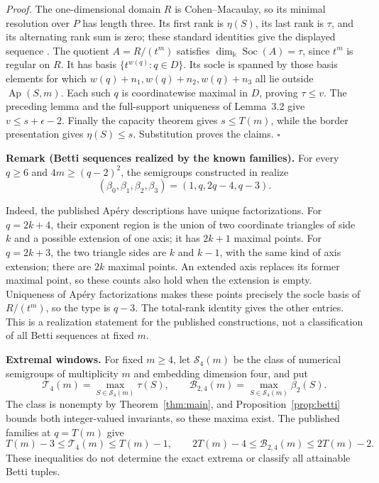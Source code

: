 \documentclass[11pt]{article}
\begin{document}
\emph{Proof.}
The one-dimensional domain $R$ is Cohen--Macaulay, so its minimal
resolution over $P$ has length three.  Its first rank is $\eta(S)$,
its last rank is $\tau$, and its alternating rank sum is zero; these
standard identities give the displayed sequence
\cite[Section~1]{MSSurvey25}.
The quotient $A=R/(t^m)$ satisfies $\dim_{\Bbbk}\operatorname{Soc}(A)=\tau$, since $t^m$ is regular on $R$. It has basis
$\{t^{w(q)}:q\in D\}$.
Its socle is spanned by those basis elements for which
$w(q)+n_1,w(q)+n_2,w(q)+n_3$ all lie outside $\operatorname{Ap}(S,m)$.
Each such $q$ is coordinatewise maximal in $D$, proving $\tau\le v$.
The preceding lemma and the full-support uniqueness of Lemma~3.2 give
$v\le s+\epsilon-2$.  Finally the capacity theorem gives $s\le T(m)$,
while the border presentation gives $\eta(S)\le s$.
Substitution proves the claims. \hfill$\square$

\medskip
\par\begin{samepage}\noindent\textbf{Remark (Betti sequences realized by the known families).}
For every $q\ge6$ and $4m\ge(q-2)^2$, the semigroups constructed in
\cite[Theorem~6.3]{EHOOPK24} realize
\[
(\beta_0,\beta_1,\beta_2,\beta_3)=(1,q,2q-4,q-3).
\]\end{samepage}
Indeed, the published Ap\'ery descriptions have unique factorizations.
For $q=2k+4$, their exponent region is the union of two coordinate
triangles of side $k$ and a possible extension of one axis; it has
$2k+1$ maximal points.  For $q=2k+3$, the two triangle sides are $k$
and $k-1$, with the same kind of axis extension; there are $2k$
maximal points. An extended axis replaces its former maximal point, so these counts also hold when the extension is empty. Uniqueness of Ap\'ery factorizations makes these
points precisely the socle basis of $R/(t^m)$, so the type is $q-3$.
The total-rank identity gives the other entries.
This is a realization statement for the published constructions,
not a classification of all Betti sequences at fixed $m$.
\par\medskip
\noindent\textbf{Extremal windows.}
For fixed \(m\ge4\), let \(\mathcal S_4(m)\) be the class of numerical
semigroups of multiplicity \(m\) and embedding dimension four, and put
\[
\mathcal T_4(m)=\max_{S\in\mathcal S_4(m)}\tau(S),
\qquad
\mathcal B_{2,4}(m)=\max_{S\in\mathcal S_4(m)}\beta_2(S).
\]
The class is nonempty by Theorem~\ref{thm:main}, and
Proposition~\ref{prop:betti} bounds both integer-valued invariants, so
these maxima exist. The published families at \(q=T(m)\) give
\[
T(m)-3\le\mathcal T_4(m)\le T(m)-1,
\qquad
2T(m)-4\le\mathcal B_{2,4}(m)\le2T(m)-2.
\]
These inequalities do not determine the exact extrema or classify
all attainable Betti tuples.
\end{document}
